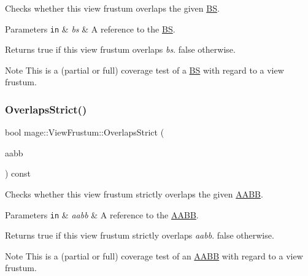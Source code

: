 Checks whether this view frustum overlaps the given \hyperlink{structmage_1_1_b_s}{BS}.


\begin{DoxyParams}[1]{Parameters}
\mbox{\tt in}  & {\em bs} & A reference to the \hyperlink{structmage_1_1_b_s}{BS}. \\
\hline
\end{DoxyParams}
\begin{DoxyReturn}{Returns}
{\ttfamily true} if this view frustum overlaps {\itshape bs}. {\ttfamily false} otherwise. 
\end{DoxyReturn}
\begin{DoxyNote}{Note}
This is a (partial or full) coverage test of a \hyperlink{structmage_1_1_b_s}{BS} with regard to a view frustum. 
\end{DoxyNote}
\hypertarget{structmage_1_1_view_frustum_a2eef224e458509eada25ec91a53753c6}{}\label{structmage_1_1_view_frustum_a2eef224e458509eada25ec91a53753c6} 
\subsubsection{\texorpdfstring{Overlaps\+Strict()}{OverlapsStrict()}\hspace{0.1cm}{\footnotesize\ttfamily [1/2]}}
{\footnotesize\ttfamily bool mage\+::\+View\+Frustum\+::\+Overlaps\+Strict (\begin{DoxyParamCaption}\item[{const \hyperlink{structmage_1_1_a_a_b_b}{A\+A\+BB} \&}]{aabb }\end{DoxyParamCaption}) const\hspace{0.3cm}{\ttfamily [noexcept]}}

Checks whether this view frustum strictly overlaps the given \hyperlink{structmage_1_1_a_a_b_b}{A\+A\+BB}.


\begin{DoxyParams}[1]{Parameters}
\mbox{\tt in}  & {\em aabb} & A reference to the \hyperlink{structmage_1_1_a_a_b_b}{A\+A\+BB}. \\
\hline
\end{DoxyParams}
\begin{DoxyReturn}{Returns}
{\ttfamily true} if this view frustum strictly overlaps {\itshape aabb}. {\ttfamily false} otherwise. 
\end{DoxyReturn}
\begin{DoxyNote}{Note}
This is a (partial or full) coverage test of an \hyperlink{structmage_1_1_a_a_b_b}{A\+A\+BB} with regard to a view frustum. 
\end{DoxyNote}
\hypertarget{structmage_1_1_view_frustum_a05963d6685c8cafc22be50c8e9b405df}{}\label{structmage_1_1_view_frustum_a05963d6685c8cafc22be50c8e9b405df} 
